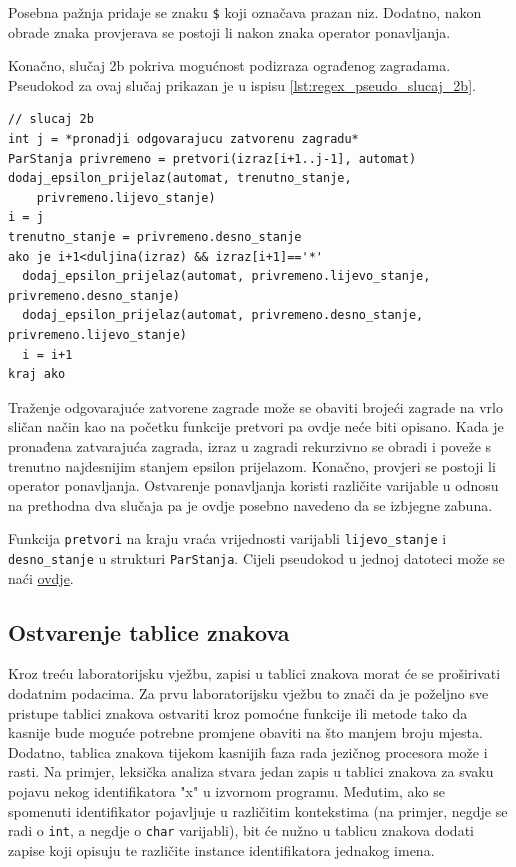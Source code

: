 \documentclass[times, 12pt, utf8]{book}
\begin{document}
Posebna pažnja pridaje se znaku \verb|$| koji označava prazan niz.
Dodatno, nakon obrade znaka provjerava se postoji li nakon znaka operator ponavljanja.

Konačno, slučaj 2b pokriva mogućnost podizraza ograđenog zagradama.
Pseudokod za ovaj slučaj prikazan je u ispisu \ref{lst:regex_pseudo_slucaj_2b}.

\begin{lstlisting}[caption={Slučaj 2b u funkciji \texttt{pretvori}.},label=lst:regex_pseudo_slucaj_2b]
// slucaj 2b
int j = *pronadji odgovarajucu zatvorenu zagradu*
ParStanja privremeno = pretvori(izraz[i+1..j-1], automat)
dodaj_epsilon_prijelaz(automat, trenutno_stanje,
    privremeno.lijevo_stanje)
i = j
trenutno_stanje = privremeno.desno_stanje
ako je i+1<duljina(izraz) && izraz[i+1]=='*'
  dodaj_epsilon_prijelaz(automat, privremeno.lijevo_stanje, privremeno.desno_stanje)
  dodaj_epsilon_prijelaz(automat, privremeno.desno_stanje, privremeno.lijevo_stanje)
  i = i+1
kraj ako
\end{lstlisting}

Traženje odgovarajuće zatvorene zagrade može se obaviti brojeći zagrade na vrlo sličan način kao na početku funkcije pretvori pa ovdje neće biti opisano.
Kada je pronađena zatvarajuća zagrada, izraz u zagradi rekurzivno se obradi i poveže s trenutno najdesnijim stanjem epsilon prijelazom.
Konačno, provjeri se postoji li operator ponavljanja.
Ostvarenje ponavljanja koristi različite varijable u odnosu na prethodna dva slučaja pa je ovdje posebno navedeno da se izbjegne zabuna.

Funkcija \verb|pretvori| na kraju vraća vrijednosti varijabli \verb|lijevo_stanje| i \verb|desno_stanje| u strukturi \verb|ParStanja|.
Cijeli pseudokod u jednoj datoteci može se naći \href{https://github.com/fer-ppj/ppj-labosi/raw/master/res/lab1/regex_pseudokod.txt}{ovdje}.

\subsection{Ostvarenje tablice znakova}
Kroz treću laboratorijsku vježbu, zapisi u tablici znakova morat će se proširivati dodatnim podacima.
Za prvu laboratorijsku vježbu to znači da je poželjno sve pristupe tablici znakova ostvariti kroz pomoćne funkcije ili metode tako da kasnije bude moguće potrebne promjene obaviti na što manjem broju mjesta.
Dodatno, tablica znakova tijekom kasnijih faza rada jezičnog procesora može i rasti.
Na primjer, leksička analiza stvara jedan zapis u tablici znakova za svaku pojavu nekog identifikatora "x" u izvornom programu.
Međutim, ako se spomenuti identifikator pojavljuje u različitim kontekstima (na primjer, negdje se radi o \verb|int|, a negdje o \verb|char| varijabli), bit će nužno u tablicu znakova dodati zapise koji opisuju te različite instance identifikatora jednakog imena.
\end{document}
